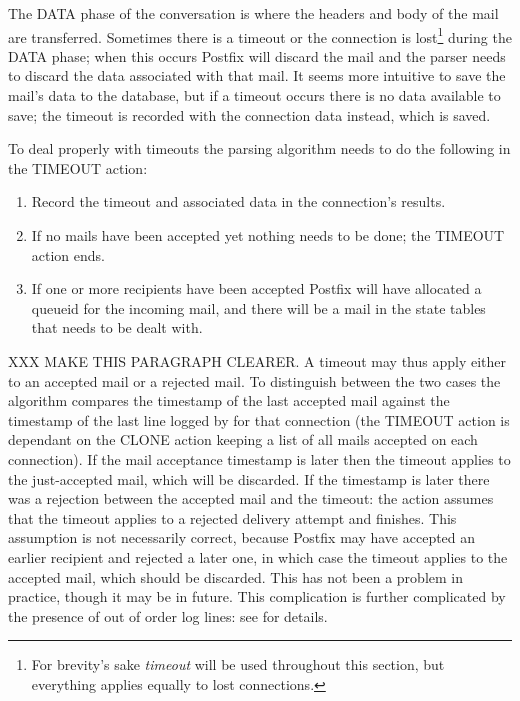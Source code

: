 \label{timeouts-during-data-phase}

The DATA phase of the  conversation is where the headers and
body of the mail are transferred.  Sometimes there is a timeout or the
connection is lost\footnote{For brevity's sake \textit{timeout\/} will be
used throughout this section, but everything applies equally to lost
connections.} during the DATA phase; when this occurs Postfix will discard
the mail and the parser needs to discard the data associated with that
mail.  It seems more intuitive to save the mail's data to the database, but
if a timeout occurs there is no data available to save; the timeout is
recorded with the connection data instead, which is saved.

To deal properly with timeouts the parsing algorithm needs to do the
following in the TIMEOUT action:

\begin{enumerate}

    \item Record the timeout and associated data in the connection's
        results.

    \item If no mails have been accepted yet nothing needs to be done; the
        TIMEOUT action ends.  

    \item If one or more recipients have been accepted Postfix will have
        allocated a queueid for the incoming mail, and there will be a mail
        in the state tables that needs to be dealt with.

\end{enumerate}

XXX MAKE THIS PARAGRAPH CLEARER\@.  A timeout may thus apply either to an
accepted mail or a rejected mail.  To distinguish between the two cases the
algorithm compares the timestamp of the last accepted mail against the
timestamp of the last line logged by  for that connection
(the TIMEOUT action is dependant on the CLONE action keeping a list of all
mails accepted on each connection).  If the mail acceptance timestamp is
later then the timeout applies to the just-accepted mail, which will be
discarded.  If the  timestamp is later there was a rejection
between the accepted mail and the timeout: the action assumes that the
timeout applies to a rejected delivery attempt and finishes.  This
assumption is not necessarily correct, because Postfix may have accepted an
earlier recipient and rejected a later one, in which case the timeout
applies to the accepted mail, which should be discarded.  This has not been
a problem in practice, though it may be in future.  This complication is
further complicated by the presence of out of order  log
lines: see  for details.

